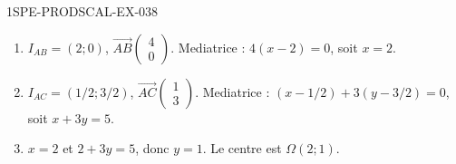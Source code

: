 \begin{corrige}{1SPE-PRODSCAL-EX-038}
\begin{enumerate}
\item $I_{AB} = (2; 0)$, $\overrightarrow{AB}\begin{pmatrix} 4 \\ 0 \end{pmatrix}$. Mediatrice : $4(x-2) = 0$, soit $x = 2$.
\item $I_{AC} = (1/2; 3/2)$, $\overrightarrow{AC}\begin{pmatrix} 1 \\ 3 \end{pmatrix}$. Mediatrice : $(x-1/2) + 3(y-3/2) = 0$, soit $x + 3y = 5$.
\item $x = 2$ et $2 + 3y = 5$, donc $y = 1$. Le centre est $\Omega(2; 1)$.
\end{enumerate}
\end{corrige}
